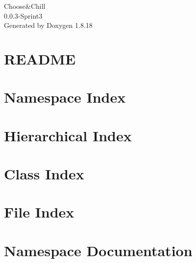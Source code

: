 \let\mypdfximage\pdfximage\def\pdfximage{\immediate\mypdfximage}\documentclass[twoside]{book}
\newcommand{\+}{\discretionary{\mbox{\scriptsize$\hookleftarrow$}}{}{}}
\newcommand{\clearemptydoublepage}{%
  \newpage{\pagestyle{empty}\cleardoublepage}%
}
\begin{document}
\hypersetup{pageanchor=false,
             bookmarksnumbered=true,
             pdfencoding=unicode
            }
\begin{titlepage}
\vspace*{7cm}
\begin{center}%
{\Large Choose\&Chill \\[1ex]\large 0.\+0.\+3-\/Sprint3 }\\
\vspace*{1cm}
{\large Generated by Doxygen 1.8.18}\\
\end{center}
\end{titlepage}
\clearemptydoublepage
{}
\tableofcontents
\clearemptydoublepage
{}
\hypersetup{pageanchor=true}

\chapter{R\+E\+A\+D\+ME}
\label{md__c_1__users__jorge__documents__git_hub__b_s_p_q20-_e2__netflix__r_e_a_d_m_e}

\chapter{Namespace Index}

\chapter{Hierarchical Index}

\chapter{Class Index}

\chapter{File Index}

\chapter{Namespace Documentation}











\end{document}
